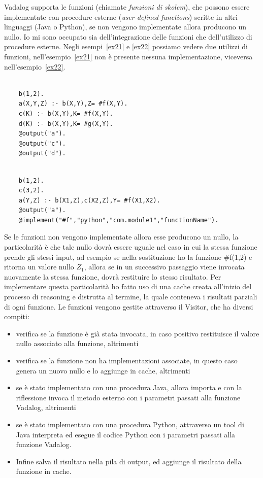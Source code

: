 Vadalog supporta le funzioni (chiamate \emph{funzioni di skolem}), che possono essere implementate con procedure esterne (\emph{user-defined functions}) scritte in altri linguaggi (Java o Python), se non vengono implementate allora producono un nullo. Io mi sono occupato sia dell'integrazione delle funzioni che dell'utilizzo di procedure esterne. \newline
Negli esempi~\ref{ex21} e \ref{ex22} possiamo vedere due utilizzi di funzioni, nell'esempio~\ref{ex21} non è presente nessuna implementazione, viceversa nell'esempio~\ref{ex22}. 
\begin{example}\label{ex21}
\normalfont
{}
	\begin{lstlisting}
	
	b(1,2).
	a(X,Y,Z) :- b(X,Y),Z= #f(X,Y).
	c(K) :- b(X,Y),K= #f(X,Y).
	d(K) :- b(X,Y),K= #g(X,Y).
	@output("a").
	@output("c").
	@output("d").
	\end{lstlisting}
\end{example}\label{ex22}
\begin{example}
\normalfont
{}
	\begin{lstlisting}
	
	b(1,2).
	c(3,2).
	a(Y,Z) :- b(X1,Z),c(X2,Z),Y= #f(X1,X2).
	@output("a").
	@implement("#f","python","com.module1","functionName").
	\end{lstlisting}
\end{example}
Se le funzioni non vengono implementate allora esse producono un nullo, la particolarità è che tale nullo dovrà essere uguale nel caso in cui la stessa funzione prende gli stessi input, ad esempio se nella sostituzione ho la funzione \#f(1,2) e ritorna un valore nullo $Z_{1}$, allora se in un successivo passaggio viene invocata nuovamente la stessa funzione, dovrà restituire lo stesso risultato. \newline
Per implementare questa particolarità ho fatto uso di una cache creata all'inizio del processo di reasoning e distrutta al termine, la quale conteneva i risultati parziali di ogni funzione. \newline
Le funzioni vengono gestite attraverso il Visitor, che ha diversi compiti: 
\begin{itemize}
	\item verifica se la funzione è già stata invocata, in caso positivo restituisce il valore nullo associato alla funzione, altrimenti
	\item verifica se la funzione non ha implementazioni associate, in questo caso genera un nuovo nullo e lo aggiunge in cache, altrimenti
	\item se è stato implementato con una procedura Java, allora importa e con la riflessione invoca il metodo esterno con i parametri passati alla funzione Vadalog, altrimenti
	\item se è stato implementato con una procedura Python, attraverso un tool di Java interpreta ed esegue il codice Python con i parametri passati alla funzione Vadalog.
	\item Infine salva il risultato nella pila di output, ed aggiunge il risultato della funzione in cache.
\end{itemize}
